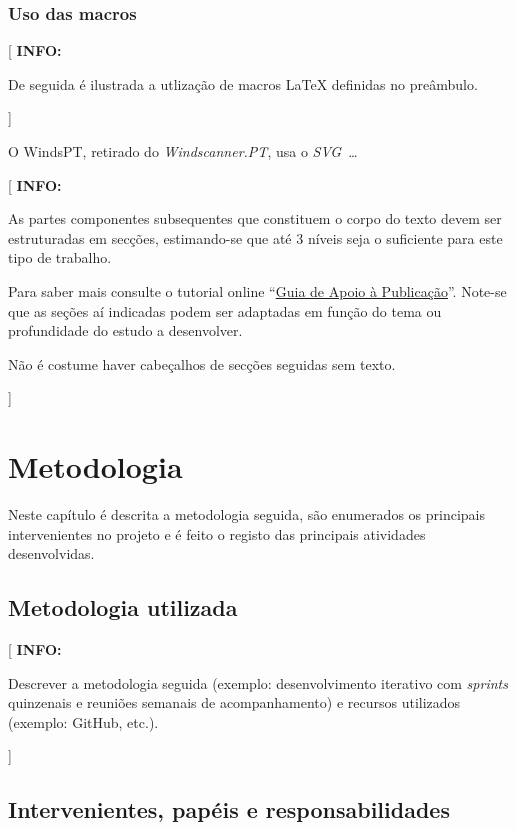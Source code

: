 \documentclass[11pt,a4paper]{report}
\newcommand{\windspt}{\textsf{WindsPT\/}}
\newcommand{\windscannerpt}{\emph{Windscanner.PT\/}}
\newcommand{\class}[1]{{\normalfont\slshape #1\/}}
\newcommand{\svg}{\class{SVG}}
\newenvironment{info}[1]{\vspace*{6mm}\color{blue}[ \textbf{INFO:} \begin{em} #1}
                        {\vspace*{3mm}\end{em} ]}
\begin{document}
\subsection*{Uso das macros}

\begin{info}
De seguida é ilustrada a utlização de macros \LaTeX{} definidas no
preâmbulo.
\end{info}

O \windspt, retirado do \windscannerpt, usa o \svg\ \ldots

\lipsum[2]

\begin{info}
As partes componentes subsequentes que constituem o corpo do texto
devem ser estruturadas em secções, estimando-se que até 3 níveis seja
o suficiente para este tipo de trabalho.

Para saber mais consulte o tutorial online 
``\href{https://docs.google.com/document/d/1TDC1behVq8x7fQL4CcPEEh_np5GXviJevQxnQ9gbiJs/edit}
{Guia de Apoio à Publicação}''.
Note-se que as seções aí indicadas podem ser adaptadas em função do tema
ou profundidade do estudo a desenvolver.

Não é costume haver cabeçalhos de secções seguidas sem texto.
\end{info}



\chapter{Metodologia}

Neste capítulo é descrita a metodologia seguida, são enumerados os
principais intervenientes no projeto e é feito o registo das
principais atividades desenvolvidas.

\section{Metodologia utilizada}

\begin{info}
Descrever a metodologia seguida (exemplo: desenvolvimento iterativo
com \emph{sprints} quinzenais e reuniões semanais de acompanhamento) e
recursos utilizados (exemplo: GitHub, etc.).
\end{info}

\section{Intervenientes, papéis e responsabilidades}
\end{document}
